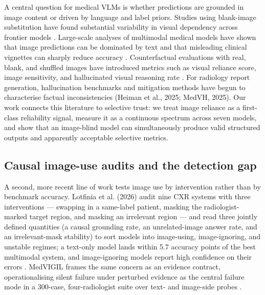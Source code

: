 A central question for medical VLMs is whether predictions are grounded in image content or driven by language and label priors. Studies using blank-image substitution have found substantial variability in visual dependency across frontier models \citep{felizzi2025grounded}. Large-scale analyses of multimodal medical models have shown that image predictions can be dominated by text and that misleading clinical vignettes can sharply reduce accuracy \citep{buckley2026exploit}. Counterfactual evaluations with real, blank, and shuffled images have introduced metrics such as visual reliance score, image sensitivity, and hallucinated visual reasoning rate \citep{zafar2026beyond}. For radiology report generation, hallucination benchmarks and mitigation methods have begun to characterise factual inconsistencies (Heiman et al., 2025; MedVH, 2025). Our work connects this literature to selective trust: we treat image reliance as a first-class reliability signal, measure it as a continuous spectrum across seven models, and show that an image-blind model can simultaneously produce valid structured outputs and apparently acceptable selective metrics.

\subsection{Causal image-use audits and the detection gap}

A second, more recent line of work tests image use by intervention rather than by benchmark accuracy. Lotfinia et al. (2026) audit nine CXR systems with three interventions --- swapping in a same-label patient, masking the radiologist-marked target region, and masking an irrelevant region --- and read three jointly defined quantities (a causal grounding rate, an unrelated-image answer rate, and an irrelevant-mask stability) to sort models into image-using, image-ignoring, and unstable regimes; a text-only model lands within 5.7 accuracy points of the best multimodal system, and image-ignoring models report high confidence on their errors \citep{lotfinia2026image}. MedVIGIL frames the same concern as an evidence contract, operationalising silent failure under perturbed evidence as the central failure mode in a 300-case, four-radiologist suite over text- and image-side probes \citep{jiang2026medvigil}.

